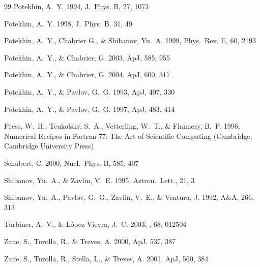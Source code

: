 \documentclass{emulateapj}
\begin{document}
\begin{thebibliography}{99}
Potekhin, A.~Y. 1994,
J.\ Phys. B, 27, 1073

Potekhin, A.~Y. 1998,
J.\ Phys. B, 31, 49

Potekhin, A.~Y., Chabrier G., \& Shibanov, Yu.~A. 1999,
Phys.\ Rev. E, 60, 2193

Potekhin, A.~Y., \& Chabrier, G. 2003,
ApJ, 585, 955

Potekhin, A.~Y., \& Chabrier, G. 2004,
ApJ, 600, 317

Potekhin, A.~Y., \& Pavlov, G.~G. 1993,
ApJ, 407, 330

Potekhin, A.~Y., \& Pavlov, G.~G. 1997,
ApJ, 483, 414

Press, W.~H., Teukolsky, S.~A., Vetterling, W.~T., \& Flannery, B.~P. 1996,
Numerical Recipes in Fortran 77: The Art of Scientific Computing
(Cambridge: Cambridge University Press)

Schubert, C. 2000,
Nucl.\ Phys. B, 585, 407

Shibanov, Yu.~A., \& Zavlin, V.~E. 1995,
Astron.\ Lett., 21, 3

Shibanov, Yu.~A., Pavlov, G.~G., Zavlin, V.~E., \& Ventura, J.
1992, A\&A, 266, 313

Turbiner, A.~V., \& L{\'o}pez Vieyra, J.~C. 2003, \pra, 68, 012504 

Zane, S., Turolla, R., \& Treves, A. 2000,
ApJ, 537, 387

Zane, S., Turolla, R., Stella, L., \& Treves, A. 2001,
ApJ, 560, 384

\end{thebibliography} 
\end{document}
